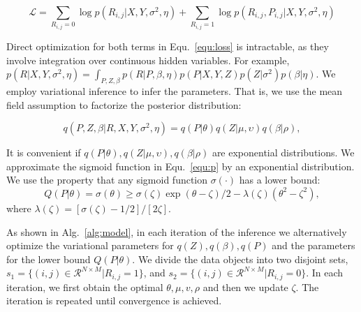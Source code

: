 \documentclass[sigconf,anonymous]{acmart}
\begin{document}
\begin{equation}\label{equ:loss}
\mathcal{L}=\sum_{R_{i,j}=0} \log p(R_{i,j}|X,Y,\sigma^2,\eta) + \sum_{R_{i,j}=1} \log p(R_{i,j},P_{i,j}|X,Y,\sigma^2,\eta)
\end{equation}


Direct optimization for both terms in Equ.~\ref{equ:loss} is intractable, as they involve integration over continuous hidden variables. For example, $p(R|X,Y,\sigma^2,\eta)=\int_{P,Z,\beta} p(R|P,\beta,\eta) p(P|X,Y,Z) p(Z|\sigma^2) p(\beta|\eta) $. We employ variational inference to infer the parameters. That is, we use the mean field assumption to factorize the posterior distribution: 

\begin{equation}
    q(P,Z,\beta|R,X,Y,\sigma^{2},\eta) = q(P|\theta)q(Z|\mu,\upsilon)q(\beta|\rho),
\end{equation}

It is convenient if $q(P|\theta),q(Z|\mu,\upsilon),q(\beta|\rho)$ are exponential distributions. We approximate the sigmoid function in Equ.~\ref{equ:p} by an exponential distribution. We use the property that any sigmoid function $\sigma(\cdot)$ has a lower bound:
\begin{equation}
Q(P|\theta)=\sigma(\theta)\geq \sigma(\zeta)\exp{(\theta-\zeta)/2-\lambda(\zeta)(\theta^2-\zeta^2)},
\end{equation}
where $\lambda(\zeta)=[\sigma(\zeta)-1/2]/[2\zeta]$.

As shown in Alg.~\ref{alg:model}, in each iteration of the inference we alternatively optimize the variational parameters for $q(Z),q(\beta), q(P)$ and the parameters for the lower bound $Q(P|\theta)$. We divide the data objects into two disjoint sets, $s_1 = \{(i,j)\in \mathcal{R}^{N\times M}|R_{i,j}=1\}$, and $s_2= \{(i,j)\in \mathcal{R}^{N\times M}|R_{i,j}=0\}$. In each iteration, we first obtain the optimal $\theta,\mu,v,\rho$ and then we update $\zeta$. The iteration is repeated until convergence is achieved.
\end{document}

